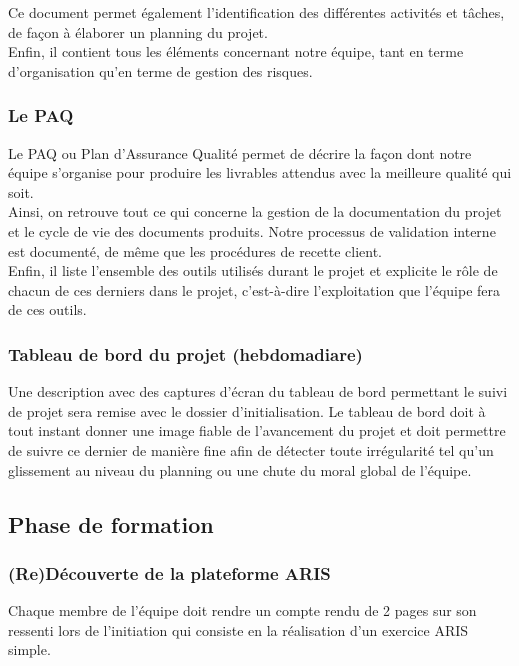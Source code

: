 Ce document permet également l’identification des différentes activités et tâches, de façon à élaborer un planning du projet. \\

Enfin, il contient tous les éléments concernant notre équipe, tant en terme d’organisation qu’en terme de gestion des risques.

\subsubsection{Le PAQ}

Le PAQ ou Plan d’Assurance Qualité permet de décrire la façon dont notre équipe s’organise pour produire les livrables attendus avec la meilleure qualité qui soit. \\

Ainsi, on retrouve tout ce qui concerne la gestion de la documentation du projet et le cycle de vie des documents produits. Notre processus de validation interne est documenté, de même que les procédures de recette client. \\

Enfin, il liste l’ensemble des outils utilisés durant le projet et explicite le rôle de chacun de ces derniers dans le projet, c’est-à-dire l’exploitation que l’équipe fera de ces outils.

\subsubsection{Tableau de bord du projet (hebdomadiare)}

Une description avec des captures d’écran du tableau de bord permettant le suivi de projet sera remise avec le dossier d’initialisation. Le tableau de bord doit à tout instant donner une image fiable de l’avancement du projet et doit permettre de suivre ce dernier de manière fine afin de détecter toute irrégularité tel qu’un glissement au niveau du planning ou une chute du moral global de l’équipe.

\subsection{Phase de formation}

\subsubsection{(Re)Découverte de la plateforme ARIS}

Chaque membre de l’équipe doit rendre un compte rendu de 2 pages sur son ressenti lors de l’initiation qui consiste en la réalisation d’un exercice ARIS simple.

